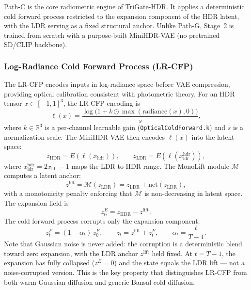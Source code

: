 \documentclass[10pt,twocolumn,letterpaper]{article}
\newcommand{\zlift}{z^{\mathrm{lift}}}
\newcommand{\xhdr}{x_{\mathrm{hdr}}}
\newcommand{\xldr}{x_{\mathrm{ldr}}}
\begin{document}
Path-C is the core radiometric engine of TriGate-HDR. It applies a deterministic cold forward process restricted to the expansion component of the HDR latent, with the LDR serving as a fixed structural anchor. Unlike Path-G, Stage~2 is trained from scratch with a purpose-built MiniHDR-VAE (no pretrained SD/CLIP backbone).

\subsubsection{Log-Radiance Cold Forward Process (LR-CFP)}

The LR-CFP encodes inputs in log-radiance space before VAE compression, providing optical calibration consistent with photometric theory. For an HDR tensor $x \in [-1,1]^3$, the LR-CFP encoding is
\begin{equation}
\ell(x) = \frac{\log\big(1 + k \odot \max(\mathrm{radiance}(x), 0)\big)}{s},
\label{eq:lrcfp}
\end{equation}
where $k \in \mathbb{R}^3$ is a per-channel learnable gain (\texttt{OpticalColdForward.k}) and $s$ is a normalization scale. The MiniHDR-VAE then encodes $\ell(x)$ into the latent space:
\begin{equation}
z_{\mathrm{HDR}} = E(\ell(\xhdr)), \qquad z_{\mathrm{LDR}} = E(\ell(x_{\mathrm{ldr}}^{\mathrm{hdr}})),
\label{eq:vae-encode}
\end{equation}
where $x_{\mathrm{ldr}}^{\mathrm{hdr}} = 2\xldr - 1$ maps the LDR to HDR range. The MonoLift module $\mathcal{M}$ computes a latent anchor:
\begin{equation}
\zlift = \mathcal{M}(z_{\mathrm{LDR}}) = z_{\mathrm{LDR}} + \mathrm{net}(z_{\mathrm{LDR}}),
\label{eq:monolift}
\end{equation}
with a monotonicity penalty enforcing that $\mathcal{M}$ is non-decreasing in latent space. The expansion field is
\begin{equation}
z_0^{E} = z_{\mathrm{HDR}} - \zlift.
\label{eq:expansion-field}
\end{equation}
The cold forward process corrupts only the expansion component:
\begin{equation}
z_t^{E} = (1-\alpha_t)\, z_0^{E}, \qquad z_t = \zlift + z_t^{E}, \qquad \alpha_t = \frac{t}{T-1}.
\label{eq:cold-fwd}
\end{equation}
Note that Gaussian noise is never added: the corruption is a deterministic blend toward zero expansion, with the LDR anchor $\zlift$ held fixed. At $t=T-1$, the expansion has fully collapsed ($z^E=0$) and the state equals the LDR lift --- not a noise-corrupted version. This is the key property that distinguishes LR-CFP from both warm Gaussian diffusion and generic Bansal cold diffusion.
\end{document}
